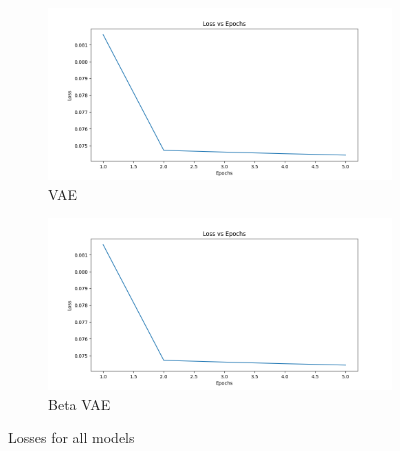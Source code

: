 \begin{figure}
  \begin{subfigure}[t]{.5\textwidth}
    \centering
    \includegraphics[width=\linewidth]{figures/loss.png}
    \caption{VAE}
  \end{subfigure}
  \hfill
  \begin{subfigure}[t]{.5\textwidth}
    \centering
    \includegraphics[width=\linewidth]{figures/loss.png}
    \caption{Beta VAE}
  \end{subfigure}
    \caption{Losses for all models}
\end{figure}